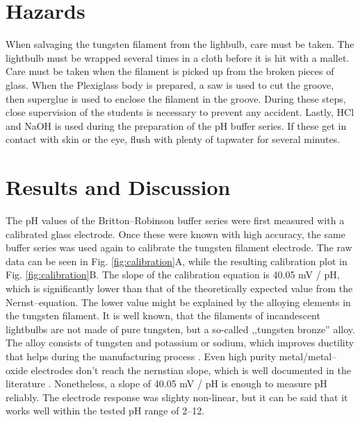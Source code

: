 \documentclass[manuscript=article, journal=jceda8]{achemso}
\begin{document}
\section{Hazards}
When salvaging the tungsten filament from the lighbulb, care must be taken. The lightbulb must be wrapped several times in a cloth before it is hit with a mallet. Care must be taken when the filament is picked up from the broken pieces of glass. When the Plexiglass body is prepared, a saw is used to cut the groove, then superglue is used to enclose the filament in the groove. During these steps, close supervision of the students is necessary to prevent any accident. Lastly, HCl and NaOH is used during the preparation of the pH buffer series. If these get in contact with skin or the eye, flush with plenty of tapwater for several minutes.


\section{Results and Discussion}

The pH values of the Britton--Robinson buffer series were first measured with a calibrated glass electrode. Once these were known with high accuracy, the same buffer series was used again to calibrate the tungsten filament electrode. The raw data can be seen in Fig. \ref{fig:calibration}A, while the resulting calibration plot in Fig. \ref{fig:calibration}B. The slope of the calibration equation is 40.05 mV / pH, which is significantly lower than that of the theoretically expected value from the Nernst--equation. The lower value might be explained by the alloying elements in the tungsten filament. It is well known, that the filaments of incandescent lightbulbs are not made of pure tungsten, but a so-called ,,tungsten bronze'' alloy. The alloy consists of tungsten and potassium or sodium, which improves ductility that helps during the manufacturing process \cite{cisternas2015electrode, wechter1972use, schade2010100}. Even high purity metal/metal--oxide electrodes don't reach the nernstian slope, which is well documented in the literature \cite{kriksunov1994tungsten, midgley1990review}. Nonetheless, a slope of 40.05 mV / pH is enough to measure pH reliably. The electrode response was slighty non-linear, but it can be said that it works well within the tested pH range of 2--12.
\end{document}
